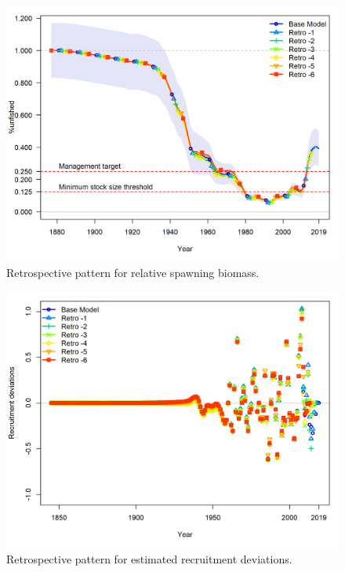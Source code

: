 \documentclass[12pt,]{article}
\begin{document}
\FloatBarrier

\begin{figure}
\centering
\includegraphics{Figures/retro_depl_5.png}
\caption{Retrospective pattern for relative spawning biomass.
\label{fig:retro_depl}}
\end{figure}

\FloatBarrier

\begin{figure}
\centering
\includegraphics{Figures/retro_recdevs_5.png}
\caption{Retrospective pattern for estimated recruitment deviations.
\label{fig:retro_recdev}}
\end{figure}
\end{document}
